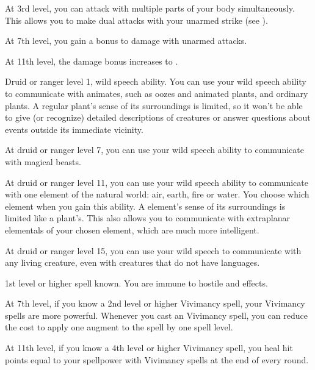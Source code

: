     At 3rd level, you can attack with multiple parts of your body simultaneously.
    This allows you to make dual attacks with your unarmed strike (see ).

    At 7th level, you gain a  bonus to damage with unarmed attacks.

    At 11th level, the damage bonus increases to .

    \featpres Druid or ranger level 1, wild speech ability.
    \featben You can use your wild speech ability to communicate with animates, such as oozes and animated plants, and ordinary plants. A regular plant's sense of its surroundings is limited, so it won't be able to give (or recognize) detailed descriptions of creatures or answer questions about events outside its immediate vicinity.

    At druid or ranger level 7, you can use your wild speech ability to communicate with magical beasts.

    At druid or ranger level 11, you can use your wild speech ability to communicate with one element of the natural world: air, earth, fire or water.
    You choose which element when you gain this ability.
    A element's sense of its surroundings is limited like a plant's.
    This also allows you to communicate with extraplanar elementals of your chosen element, which are much more intelligent.

    At druid or ranger level 15, you can use your wild speech to communicate with any living creature, even with creatures that do not have languages.

    \featpres 1st level or higher  spell known.
    \featben You are immune to hostile  and  effects.

    At 7th level, if you know a 2nd level or higher Vivimancy spell, your Vivimancy spells are more powerful.
    Whenever you cast an Vivimancy spell, you can reduce the cost to apply one augment to the spell by one spell level.

    At 11th level, if you know a 4th level or higher Vivimancy spell, you heal hit points equal to your spellpower with Vivimancy spells at the end of every round.

